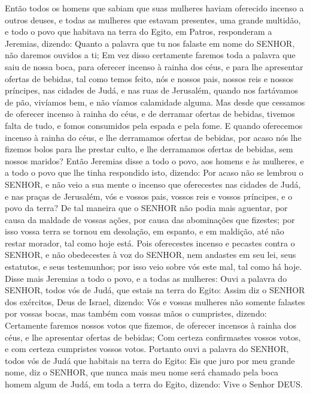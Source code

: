 {Então todos os homens que sabiam que suas mulheres haviam oferecido incenso a outros deuses, e todas as mulheres que estavam presentes, uma grande multidão, e todo o povo que habitava na terra do Egito, em Patros, responderam a Jeremias, dizendo:
Quanto a palavra que tu nos falaste em nome do SENHOR, não daremos ouvidos a ti;
Em vez disso certamente faremos toda a palavra que saiu de nossa boca, para oferecer incenso à rainha dos céus, e para lhe apresentar ofertas de bebidas, tal como temos feito, nós e nossos pais, nossos reis e nossos príncipes, nas cidades de Judá, e nas ruas de Jerusalém, quando nos fartávamos de pão, vivíamos bem, e não víamos calamidade
 alguma.
Mas desde que cessamos de oferecer incenso à rainha do céus, e de derramar ofertas de bebidas, tivemos falta de tudo, e fomos consumidos pela espada e pela fome.
E quando oferecemos incenso à rainha do céus, e lhe derramamos ofertas de bebidas, por acaso nós lhe fizemos bolos para lhe prestar culto, e lhe derramamos ofertas de bebidas, sem nossos maridos?
Então Jeremias disse a todo o povo, aos homens e às mulheres, e a todo o povo que lhe tinha respondido isto, dizendo:
Por acaso não se lembrou o SENHOR, e não veio a sua mente o incenso que oferecestes nas cidades de Judá, e nas praças de Jerusalém, vós e vossos pais, vossos reis e vossos príncipes, e o povo da terra?
De tal maneira que o SENHOR não podia mais aguentar, por causa da maldade de vossas ações, por causa das abominações que fizestes; por isso vossa terra se tornou em desolação, em espanto, e em maldição, até não restar morador, tal como hoje está.
Pois oferecestes incenso e pecastes contra o SENHOR, e não obedecestes à voz do SENHOR, nem andastes em seu lei, seus estatutos, e seus testemunhos; por isso veio sobre vós este mal, tal como há hoje.
Disse mais Jeremias a todo o povo, e a todas as mulheres: Ouvi a palavra do SENHOR, todos vós de Judá, que estais na terra do Egito:
Assim diz o SENHOR dos exércitos, Deus de Israel, dizendo: Vós e vossas mulheres não somente falastes por vossas bocas, mas também com vossas mãos o cumpristes, dizendo: Certamente faremos nossos votos que fizemos, de oferecer incensos à rainha dos céus, e lhe apresentar ofertas de bebidas; Com certeza confirmastes vossos votos, e com certeza cumpristes vossos votos.
Portanto ouvi a palavra do SENHOR, todos vós de Judá que habitais na terra do Egito: Eis que juro por meu grande nome, diz o SENHOR, que nunca mais meu nome será chamado pela boca homem algum de Judá, em toda a terra do Egito, dizendo: Vive o Senhor DEUS.
}
